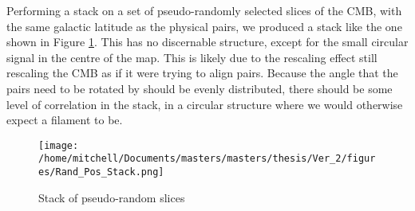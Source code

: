 Performing a stack on a set of pseudo-randomly selected slices of the CMB, with the same galactic latitude as the physical pairs, we produced a stack like the one shown in Figure \ref{fig:random:stack}. This has no discernable structure, except for the small circular signal in the centre of the map. This is likely due to the rescaling effect still rescaling the CMB as if it were trying to align pairs. Because the angle that the pairs need to be rotated by should be evenly distributed, there should be some level of correlation in the stack, in a circular structure where we would otherwise expect a filament to be. 

\begin{figure}[h!]
\centering
\texttt{[image: /home/mitchell/Documents/masters/masters/thesis/Ver\_2/figures/Rand\_Pos\_Stack.png]}
\caption{Stack of pseudo-random slices}
\label{fig:random:stack}
\end{figure}


